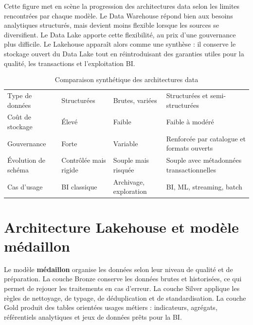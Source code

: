 Cette figure met en scène la progression des architectures data selon les limites rencontrées par chaque modèle. Le Data Warehouse répond bien aux besoins analytiques structurés, mais devient moins flexible lorsque les sources se diversifient. Le Data Lake apporte cette flexibilité, au prix d'une gouvernance plus difficile. Le Lakehouse apparaît alors comme une synthèse : il conserve le stockage ouvert du Data Lake tout en réintroduisant des garanties utiles pour la qualité, les transactions et l'exploitation BI.

\begin{table}[H]
\centering
\caption{Comparaison synthétique des architectures data}
\label{tab:data-architectures}
\PFETableSetup
{}
\begin{tabularx}{\textwidth}{|p{}|Y|Y|Y|}
\hline
{}
 &  &  &  \\
\hline
Type de données & Structurées & Brutes, variées & Structurées et semi-structurées \\
\hline
Coût de stockage & Élevé & Faible & Faible à modéré \\
\hline
Gouvernance & Forte & Variable & Renforcée par catalogue et formats ouverts \\
\hline
Évolution de schéma & Contrôlée mais rigide & Souple mais risquée & Souple avec métadonnées transactionnelles \\
\hline
Cas d'usage & BI classique & Archivage, exploration & BI, ML, streaming, batch \\
\hline
\end{tabularx}
\end{table}

\section{Architecture Lakehouse et modèle médaillon}

Le modèle \textbf{médaillon} organise les données selon leur niveau de qualité et de préparation. La couche Bronze conserve les données brutes et historisées, ce qui permet de rejouer les traitements en cas d'erreur. La couche Silver applique les règles de nettoyage, de typage, de déduplication et de standardisation. La couche Gold produit des tables orientées usages métiers : indicateurs, agrégats, référentiels analytiques et jeux de données prêts pour la BI.

